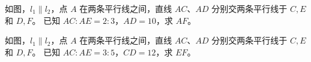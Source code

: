 \documentclass{exam-zh}
\begin{document}
\begin{problem}[points=8]
  \noindent
  \begin{minipage}[t]{\dimexpr\linewidth-60mm-6mm\relax}
    \vspace{0pt}
    如图，$l_1\parallel l_2$，点 $A$ 在两条平行线之间，直线 $AC$、$AD$ 分别交两条平行线于 $C,E$ 和 $D,F$。
已知 $AC:AE=2:3$，$AD=10$，求 $AF$。


  \end{minipage}\hfill
  \begin{diagramcoltikz}{60mm}{第 3 题图}
  }
  \end{diagramcoltikz}
  \par\medskip
  \answerarea[35mm]
\end{problem}



\begin{problem}[points=8]
  \noindent
  \begin{minipage}[t]{\dimexpr\linewidth-60mm-6mm\relax}
    \vspace{0pt}
    如图，$l_1\parallel l_2$，点 $A$ 在两条平行线之间，直线 $AC$、$AD$ 分别交两条平行线于 $C,E$ 和 $D,F$。
已知 $AC:AE=3:5$，$CD=12$，求 $EF$。


  \end{minipage}\hfill
  \begin{diagramcoltikz}{60mm}{第 4 题图}
  }
  \end{diagramcoltikz}
  \par\medskip
  \answerarea[35mm]
\end{problem}
\end{document}
